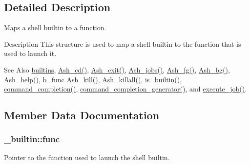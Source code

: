 \subsection{Detailed Description}
Maps a shell builtin to a function. 

\begin{DoxyParagraph}{Description}
This structure is used to map a shell builtin to the function that is used to launch it.
\end{DoxyParagraph}
\begin{DoxySeeAlso}{See Also}
\hyperlink{job_8c_a2c5551422426f406568d84844b40acb9}{builtins}, \hyperlink{job_8c_a2c2cfa6591ee05cc5bf0c39f38b9e2ea}{Ash\-\_\-cd()}, \hyperlink{job_8c_a9fa5abe15df71a688905dc7b29a1389f}{Ash\-\_\-exit()}, \hyperlink{job_8c_a8950ee4bf84f8322e0b294d0c448a9e7}{Ash\-\_\-jobs()}, \hyperlink{job_8c_a792fcc9814d020b087911591c5fce10b}{Ash\-\_\-fg()}, \hyperlink{job_8c_a9bc6f26d0ab14359707a0f367f1a6522}{Ash\-\_\-bg()}, \hyperlink{job_8c_a4242d3cdbc0468d774243dc67b330296}{Ash\-\_\-help()}, \hyperlink{job_8h_af6b8d1779250c4d2f3c902dc1aad5a5d}{b\-\_\-func} \hyperlink{job_8c_a723e6648fca47a139cdff5cf4f1bc4bb}{Ash\-\_\-kill()}, \hyperlink{job_8c_a07e5c62e1d5e55012cf188dd32b6cf27}{Ash\-\_\-killall()}, \hyperlink{job_8c_a028aee0dd87474ee61f6c654efe653a2}{is\-\_\-builtin()}, \hyperlink{cle_8c_ab57f2ac63325fc919968e7eb78586965}{command\-\_\-completion()}, \hyperlink{cle_8c_ade079408c61657dc7bbd2142a78e0e8a}{command\-\_\-completion\-\_\-generator()}, and \hyperlink{job_8c_a328634c49391a29ef1d4e86d6bf0ea7e}{execute\-\_\-job()}. 
\end{DoxySeeAlso}


\subsection{Member Data Documentation}
\hypertarget{struct__builtin_adb30d358f5fb6b16dc124796851e0c48}{
\subsubsection[{func}]{ \-\_\-builtin\-::func}}\label{struct__builtin_adb30d358f5fb6b16dc124796851e0c48}


Pointer to the function used to launch the shell builtin. 

